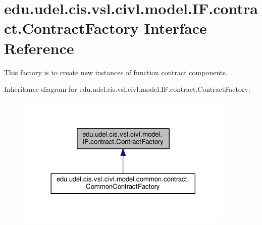 \hypertarget{interfaceedu_1_1udel_1_1cis_1_1vsl_1_1civl_1_1model_1_1IF_1_1contract_1_1ContractFactory}{}\section{edu.\+udel.\+cis.\+vsl.\+civl.\+model.\+I\+F.\+contract.\+Contract\+Factory Interface Reference}
\label{interfaceedu_1_1udel_1_1cis_1_1vsl_1_1civl_1_1model_1_1IF_1_1contract_1_1ContractFactory}


This factory is to create new instances of function contract components.  




Inheritance diagram for edu.\+udel.\+cis.\+vsl.\+civl.\+model.\+I\+F.\+contract.\+Contract\+Factory\+:
\nopagebreak
\begin{figure}[H]
\begin{center}
\leavevmode
\includegraphics[width=294pt]{interfaceedu_1_1udel_1_1cis_1_1vsl_1_1civl_1_1model_1_1IF_1_1contract_1_1ContractFactory__inherit__graph}
\end{center}
\end{figure}
